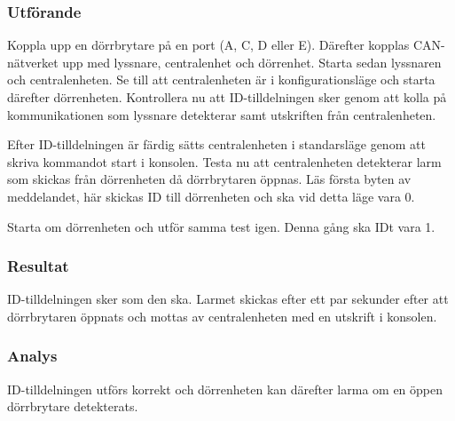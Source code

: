\subsubsection*{Utförande}
Koppla upp en dörrbrytare på en port (A, C, D eller E). Därefter kopplas CAN-nätverket upp med lyssnare, centralenhet och dörrenhet. Starta sedan lyssnaren och centralenheten. Se till att centralenheten är i konfigurationsläge och starta därefter dörrenheten. Kontrollera nu att ID-tilldelningen sker genom att kolla på kommunikationen som lyssnare detekterar samt utskriften från centralenheten. 

Efter ID-tilldelningen är färdig sätts centralenheten i standarsläge genom att skriva kommandot start i konsolen. Testa nu att centralenheten detekterar larm som skickas från dörrenheten då dörrbrytaren öppnas. Läs första byten av meddelandet, här skickas ID till dörrenheten och ska vid detta läge vara 0.

Starta om dörrenheten och utför samma test igen. Denna gång ska IDt vara 1.


\subsubsection*{Resultat}
ID-tilldelningen sker som den ska. Larmet skickas efter ett par sekunder efter att dörrbrytaren öppnats och mottas av centralenheten med en utskrift i konsolen.


\subsubsection*{Analys}
ID-tilldelningen utförs korrekt och dörrenheten kan därefter larma om en öppen dörrbrytare detekterats.


